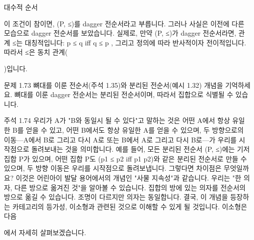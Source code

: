 \documentclass[11pt, a4paper, twoside, openany]{book}
\begin{document}
\par\medskip
대수적 순서

\par\medskip
이 조건이 참이면, (P, ≤)를 dagger 전순서라고 부릅니다.
그러나 사실은 이전에 다른 모습으로 dagger 전순서를 보았습니다. 실제로, 만약 (P, ≤)가 dagger 전순서라면, 관계 ≤는 대칭적입니다: p ≤ q  iff q ≤ p , 그리고 정의에 따라 반사적이자 전이적입니다. 따라서 ≤은 동치 관계(
\begin{definitionbox}[정의 1.18]
)입니다.
\end{definitionbox}

\par\medskip
문제 1.73
뼈대를 이룬 전순서(주석 1.35)와 분리된 전순서(예시 1.32) 개념을 기억하세요.
뼈대를 이룬 dagger 전순서는 분리된 전순서이며, 따라서 집합으로 식별될 수 있습니다.

\par\medskip
주석 1.74
우리가 A\hspace{0pt}가 "B\hspace{0pt}와 동일시 될 수 있다"고 말하는 것은 어떤 A\hspace{0pt}에서 항상 유일한 B\hspace{0pt}를 얻을 수 있고, 어떤 B\hspace{0pt}에서도 항상 유일한 A\hspace{0pt}를 얻을 수 있으며, 두 방향으로의 이동—A\hspace{0pt}에서 B\hspace{0pt}로 그리고 다시 A\hspace{0pt}로 또는 B\hspace{0pt}에서 A\hspace{0pt}로 그리고 다시 B\hspace{0pt}로—가 우리를 시작점으로 돌려보내는 것을 의미합니다. 예를 들어, 모든 분리된 전순서 (P, ≤)에는 기저 집합 P\hspace{0pt}가 있으며, 어떤 집합 P\hspace{0pt}도 (p1 ≤ p2 iff p1  p2)와 같은 분리된 전순서로 만들 수 있으며, 두 방향 이동은 우리를 시작점으로 돌려보냅니다. 그렇다면 차이점은 무엇일까요? 이것은 어린아이 발달 용어에서의 개념인 "사물 지속성"과 같습니다. 우리는 "한 의자, 다른 방으로 옮겨진 것"을 알아볼 수 있습니다. 집합의 방에 있는 의자를 전순서의 방으로 옮길 수 있습니다. 조명이 다르지만 의자는 동일합니다.
결국, 이 개념을 등장하는 카테고리의 등가성, 이소형과 관련된 것으로 이해할 수 있게 될 것입니다. 이소형은 다음 
\begin{definitionbox}[정의 1.75]
\hspace{0pt}에서 자세히 살펴보겠습니다.
\end{definitionbox}
\end{document}
